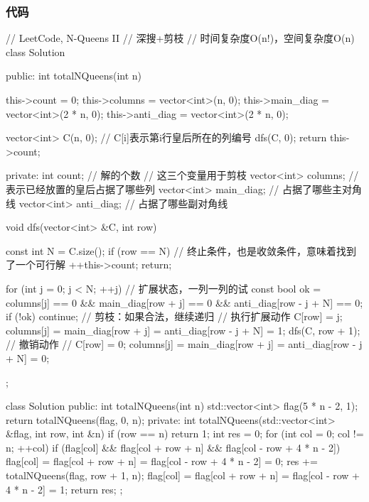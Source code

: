 \subsubsection{代码}
\begin{Code}
// LeetCode, N-Queens II
// 深搜+剪枝
// 时间复杂度O(n!)，空间复杂度O(n)
class Solution {
public:
    int totalNQueens(int n) {
        this->count = 0;
        this->columns = vector<int>(n, 0);
        this->main_diag = vector<int>(2 * n, 0);
        this->anti_diag = vector<int>(2 * n, 0);

        vector<int> C(n, 0);  // C[i]表示第i行皇后所在的列编号
        dfs(C, 0);
        return this->count;
    }
private:
    int count; // 解的个数
    // 这三个变量用于剪枝
    vector<int> columns;  // 表示已经放置的皇后占据了哪些列
    vector<int> main_diag;  // 占据了哪些主对角线
    vector<int> anti_diag;  // 占据了哪些副对角线

    void dfs(vector<int> &C, int row) {
        const int N = C.size();
        if (row == N) { // 终止条件，也是收敛条件，意味着找到了一个可行解
            ++this->count;
            return;
        }

        for (int j = 0; j < N; ++j) {  // 扩展状态，一列一列的试
            const bool ok = columns[j] == 0 &&
                    main_diag[row + j] == 0 &&
                    anti_diag[row - j + N] == 0;
            if (!ok) continue;  // 剪枝：如果合法，继续递归
            // 执行扩展动作
            C[row] = j;
            columns[j] = main_diag[row + j] =
                    anti_diag[row - j + N] = 1;
            dfs(C, row + 1);
            // 撤销动作
            // C[row] = 0;
            columns[j] = main_diag[row + j] =
                    anti_diag[row - j + N] = 0;
        }
    }
};
\end{Code}

\begin{Code}
class Solution {
public:
    int totalNQueens(int n) {
        std::vector<int> flag(5 * n - 2, 1);
        return totalNQueens(flag, 0, n);
    }
private:
    int totalNQueens(std::vector<int> &flag, int row, int &n) {
        if (row == n)
            return 1;
        int res = 0;
        for (int col = 0; col != n; ++col)
            if (flag[col] && flag[col + row + n] && flag[col - row + 4 * n - 2]) {
                flag[col] = flag[col + row + n] = flag[col - row + 4 * n - 2] = 0;
                res += totalNQueens(flag, row + 1, n);
                flag[col] = flag[col + row + n] = flag[col - row + 4 * n - 2] = 1;
            }
        return res;
    }
};
\end{Code}

